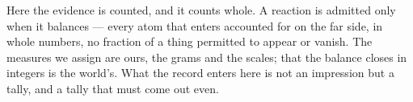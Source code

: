 %
%
%
%

\noindent Here the evidence is counted, and it counts whole. A reaction is admitted only when it balances ---
every atom that enters accounted for on the far side, in whole numbers, no fraction of a thing permitted to
appear or vanish. The measures we assign are ours, the grams and the scales; that the balance closes in
integers is the world's. What the record enters here is not an impression but a tally, and a tally that must
come out even.

